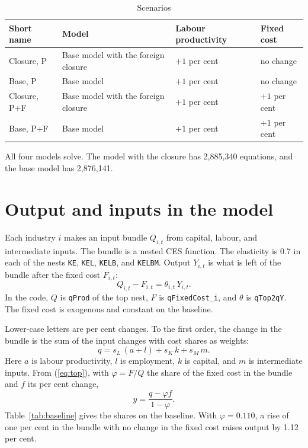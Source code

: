 \documentclass[11pt,a4paper]{article}
\newcommand{\code}[1]{\texttt{#1}}
\begin{document}
\begin{table}[H]
\centering
\small
\caption{Scenarios}
\label{tab:scenarios}
\begin{tabular}{@{}llll@{}}
\toprule
Short name & Model & Labour productivity & Fixed cost \\
\midrule
Closure, P & Base model with the foreign closure & $+1$ per cent & no change \\
Base, P & Base model & $+1$ per cent & no change \\
Closure, P+F & Base model with the foreign closure & $+1$ per cent & $+1$ per cent \\
Base, P+F & Base model & $+1$ per cent & $+1$ per cent \\
\bottomrule
\end{tabular}
\end{table}

All four models solve. The model with the closure has 2{,}885{,}340 equations, and the base model has 2{,}876{,}141.

\section{Output and inputs in the model}
\label{sec:block}

Each industry $i$ makes an input bundle $Q_{i,t}$ from capital, labour, and intermediate inputs. The bundle is a nested CES function. The elasticity is 0.7 in each of the nests \code{KE}, \code{KEL}, \code{KELB}, and \code{KELBM}.
Output $Y_{i,t}$ is what is left of the bundle after the fixed cost $F_{i,t}$:
\begin{equation}
Q_{i,t} - F_{i,t} = \theta_{i,t}\, Y_{i,t} .
\label{eq:top}
\end{equation}
In the code, $Q$ is \code{qProd} of the top nest, $F$ is \code{qFixedCost\_i}, and $\theta$ is \code{qTop2qY}. The fixed cost is exogenous and constant on the baseline.

Lower-case letters are per cent changes. To the first order, the change in the bundle is the sum of the input changes with cost shares as weights:
\begin{equation}
q = s_L\, (a + l) + s_K\, k + s_M\, m .
\label{eq:bundle}
\end{equation}
Here $a$ is labour productivity, $l$ is employment, $k$ is capital, and $m$ is intermediate inputs.
From (\ref{eq:top}), with $\varphi = F/Q$ the share of the fixed cost in the bundle and $f$ its per cent change,
\begin{equation}
y = \frac{q - \varphi f}{1 - \varphi} .
\label{eq:output}
\end{equation}
Table~\ref{tab:baseline} gives the shares on the baseline. With $\varphi = 0.110$, a rise of one per cent in the bundle with no change in the fixed cost raises output by 1.12 per cent.
\end{document}
